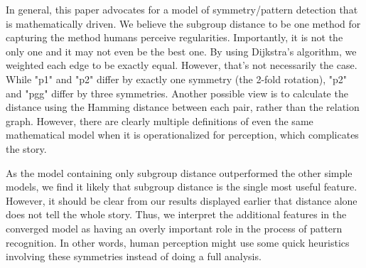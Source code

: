 In general, this paper advocates for a model of symmetry/pattern detection that is mathematically driven. We believe the subgroup distance to be one method for capturing the method humans perceive regularities. Importantly, it is not the only one and it may not even be the best one. By using Dijkstra's algorithm, we weighted each edge to be exactly equal. However, that's not necessarily the case. While "p1" and "p2" differ by exactly one symmetry (the 2-fold rotation), "p2" and "pgg" differ by three symmetries. Another possible view is to calculate the distance using the Hamming distance between each pair, rather than the relation graph. However, there are clearly multiple definitions of even the same mathematical model when it is operationalized for perception, which complicates the story.

As the model containing only subgroup distance outperformed the other simple models, we find it likely that subgroup distance is the single most useful feature. However, it should be clear from our results displayed earlier that distance alone does not tell the whole story. Thus, we interpret the additional features in the converged model as having an overly important role in the process of pattern recognition. In other words, human perception might use some quick heuristics involving these symmetries instead of doing a full analysis. 


